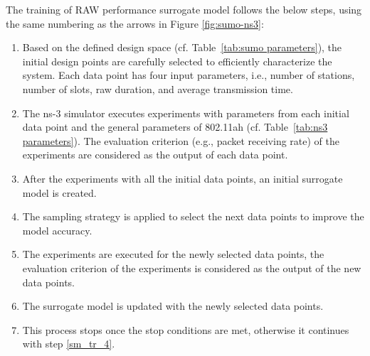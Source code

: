 The training of RAW performance surrogate model follows the below steps, using the same numbering as the arrows in Figure \ref{fig:sumo-ns3}:

\begin{enumerate}

\item \label{sm_tr_1} Based on the defined design space (cf. Table~\ref{tab:sumo parameters}), the initial design points are carefully selected to efficiently characterize the system. Each data point has four input parameters, i.e., number of stations, number of slots, \gls{raw} duration, and average transmission time.


\item \label{sm_tr_2} The ns-3 simulator executes experiments with parameters from each initial data point and the general parameters of 802.11ah (cf. Table~\ref{tab:ns3 parameters}). The evaluation criterion (e.g., packet receiving rate) of the experiments are considered as the output of each data point. 

\item \label{sm_tr_3} After the experiments with all the initial data points, an initial surrogate model is created.


\item \label{sm_tr_4} The sampling strategy is applied to select the next data points to improve the model accuracy.

\item \label{sm_tr_5} The experiments are executed for the newly selected data points, the evaluation criterion of the experiments is considered as the output of the new data points. 

\item \label{sm_tr_6} The surrogate model is updated with the newly selected data points.

\item \label{sm_tr_7}  This process stops once the stop conditions are met, otherwise it continues with step \ref{sm_tr_4}.
\end{enumerate}


